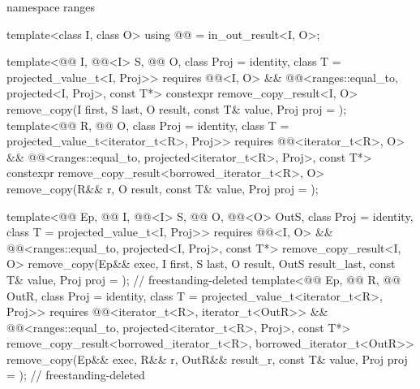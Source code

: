 \begin{codeblock}
{  namespace ranges {
    template<class I, class O>
      using @@ = in_out_result<I, O>;

    template<@@ I, @@<I> S, @@ O,
             class Proj = identity, class T = projected_value_t<I, Proj>>
      requires @@<I, O> &&
               @@<ranges::equal_to, projected<I, Proj>, const T*>
      constexpr remove_copy_result<I, O>
        remove_copy(I first, S last, O result, const T& value, Proj proj = {});
    template<@@ R, @@ O, class Proj = identity,
             class T = projected_value_t<iterator_t<R>, Proj>>
      requires @@<iterator_t<R>, O> &&
               @@<ranges::equal_to,
                                         projected<iterator_t<R>, Proj>, const T*>
      constexpr remove_copy_result<borrowed_iterator_t<R>, O>
        remove_copy(R&& r, O result, const T& value, Proj proj = {});

    template<@@ Ep, @@ I, @@<I> S,
             @@ O, @@<O> OutS,
             class Proj = identity, class T = projected_value_t<I, Proj>>
      requires @@<I, O> &&
               @@<ranges::equal_to, projected<I, Proj>, const T*>
      remove_copy_result<I, O>
        remove_copy(Ep&& exec, I first, S last, O result, OutS result_last, const T& value,
                    Proj proj = {});                                        // freestanding-deleted
    template<@@ Ep, @@ R, @@ OutR,
             class Proj = identity, class T = projected_value_t<iterator_t<R>, Proj>>
      requires @@<iterator_t<R>, iterator_t<OutR>> &&
               @@<ranges::equal_to,
                                         projected<iterator_t<R>, Proj>, const T*>
      remove_copy_result<borrowed_iterator_t<R>, borrowed_iterator_t<OutR>>
        remove_copy(Ep&& exec, R&& r, OutR&& result_r, const T& value,
                    Proj proj = {});                                        // freestanding-deleted

}}
\end{codeblock}
